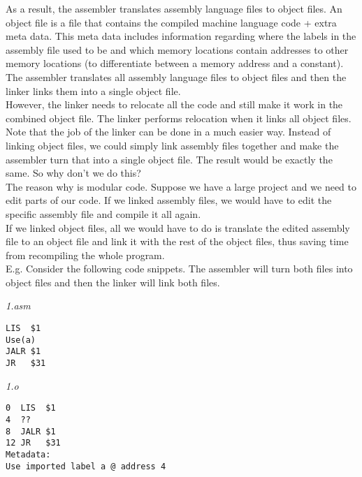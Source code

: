 \documentclass[12pt, letterpaper]{article}
\begin{document}
As a result, the assembler translates assembly language files to object files. An object file is a file that contains the compiled machine language code + extra meta data. This meta data includes information regarding where the labels in the assembly file used to be and which memory locations contain addresses to other memory locations (to differentiate between a memory address and a constant). The assembler translates all assembly language files to object files and then the linker links them into a single object file.\\

However, the linker needs to relocate all the code and still make it work in the combined object file. The linker performs relocation when it links all object files. Note that the job of the linker can be done in a much easier way. Instead of linking object files, we could simply link assembly files together and make the assembler turn that into a single object file. The result would be exactly the same. So why don't we do this?\\

The reason why is modular code. Suppose we have a large project and we need to edit parts of our code. If we linked assembly files, we would have to edit the specific assembly file and compile it all again.\\

If we linked object files, all we would have to do is translate the edited assembly file to an object file and link it with the rest of the object files, thus saving time from recompiling the whole program. \\

E.g. Consider the following code snippets. The assembler will turn both files into object files and then the linker will link both files.\\

\begin{minipage}[t]{0.5\textwidth}
\emph{1.asm}
\begin{verbatim}
LIS  $1
Use(a)
JALR $1
JR   $31
\end{verbatim}
\end{minipage}
\begin{minipage}[t]{0.5\textwidth}
\emph{1.o}
\begin{verbatim}
0  LIS  $1
4  ??
8  JALR $1
12 JR   $31
Metadata:
Use imported label a @ address 4
\end{verbatim}
\end{minipage}

\vspace{5mm}
\end{document}
